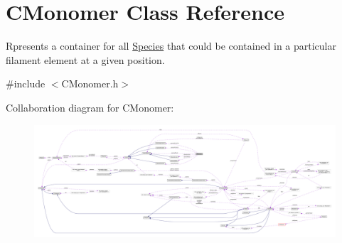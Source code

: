 \hypertarget{classCMonomer}{\section{C\+Monomer Class Reference}
\label{classCMonomer}
}


Rpresents a container for all \hyperlink{classSpecies}{Species} that could be contained in a particular filament element at a given position.  




{\ttfamily \#include $<$C\+Monomer.\+h$>$}



Collaboration diagram for C\+Monomer\+:
\nopagebreak
\begin{figure}[H]
\begin{center}
\leavevmode
\includegraphics[width=350pt]{classCMonomer__coll__graph}
\end{center}
\end{figure}
